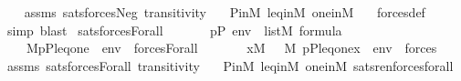 \begin{isabellebody}
%
\isadelimproof
\ \ %
\endisadelimproof
%
\isatagproof
{}\isamarkupfalse%
\ assms\ sats{\isacharunderscore}{\kern0pt}forces{\isacharunderscore}{\kern0pt}Neg\ transitivity\ \isanewline
\ \ P{\isacharunderscore}{\kern0pt}in{\isacharunderscore}{\kern0pt}M\ leq{\isacharunderscore}{\kern0pt}in{\isacharunderscore}{\kern0pt}M\ one{\isacharunderscore}{\kern0pt}in{\isacharunderscore}{\kern0pt}M\ \ \isamarkupfalse%
\ forces{\isacharunderscore}{\kern0pt}def\isanewline
\ \ \isamarkupfalse%
\ {\isacharparenleft}{\kern0pt}simp{\isacharcomma}{\kern0pt}\ blast{\isacharparenright}{\kern0pt}%
\endisatagproof
{\isafoldproof}%
%
\isadelimproof
\isanewline
%
\endisadelimproof
\isanewline
{}\isamarkupfalse%
\ sats{\isacharunderscore}{\kern0pt}forces{\isacharunderscore}{\kern0pt}Forall{\isacharprime}{\kern0pt}{\isacharcolon}{\kern0pt}\isanewline
\ \ \isanewline
\ \ \ \ {\isachardoublequoteopen}p{\isasymin}P{\isachardoublequoteclose}\ {\isachardoublequoteopen}env\ {\isasymin}\ list{\isacharparenleft}{\kern0pt}M{\isacharparenright}{\kern0pt}{\isachardoublequoteclose}\ {\isachardoublequoteopen}{\isasymphi}{\isasymin}formula{\isachardoublequoteclose}\isanewline
\ \ \isanewline
\ \ \ \ {\isachardoublequoteopen}M{\isacharcomma}{\kern0pt}{\isacharbrackleft}{\kern0pt}p{\isacharcomma}{\kern0pt}P{\isacharcomma}{\kern0pt}leq{\isacharcomma}{\kern0pt}one{\isacharbrackright}{\kern0pt}\ {\isacharat}{\kern0pt}\ env\ {\isasymTurnstile}\ forces{\isacharparenleft}{\kern0pt}Forall{\isacharparenleft}{\kern0pt}{\isasymphi}{\isacharparenright}{\kern0pt}{\isacharparenright}{\kern0pt}\ {\isasymlongleftrightarrow}\ \isanewline
\ \ \ \ \ {\isacharparenleft}{\kern0pt}{\isasymforall}x{\isasymin}M{\isachardot}{\kern0pt}\ \ \ M{\isacharcomma}{\kern0pt}\ {\isacharbrackleft}{\kern0pt}p{\isacharcomma}{\kern0pt}P{\isacharcomma}{\kern0pt}leq{\isacharcomma}{\kern0pt}one{\isacharcomma}{\kern0pt}x{\isacharbrackright}{\kern0pt}\ {\isacharat}{\kern0pt}\ env\ {\isasymTurnstile}\ forces{\isacharparenleft}{\kern0pt}{\isasymphi}{\isacharparenright}{\kern0pt}{\isacharparenright}{\kern0pt}{\isachardoublequoteclose}\isanewline
%
\isadelimproof
\ \ %
\endisadelimproof
%
\isatagproof
{}\isamarkupfalse%
\ assms\ sats{\isacharunderscore}{\kern0pt}forces{\isacharunderscore}{\kern0pt}Forall\ transitivity\ \isanewline
\ \ P{\isacharunderscore}{\kern0pt}in{\isacharunderscore}{\kern0pt}M\ leq{\isacharunderscore}{\kern0pt}in{\isacharunderscore}{\kern0pt}M\ one{\isacharunderscore}{\kern0pt}in{\isacharunderscore}{\kern0pt}M\ sats{\isacharunderscore}{\kern0pt}ren{\isacharunderscore}{\kern0pt}forces{\isacharunderscore}{\kern0pt}forall\ \isamarkupfalse%

\end{isabellebody}
